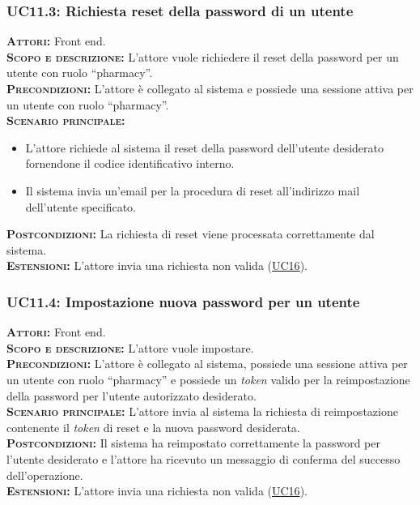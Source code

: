 \subsubsection{UC11.3: Richiesta reset della password di un utente}
\label{sec:UC113}
\textsc{\textbf{Attori:}} Front end.\\
\textsc{\textbf{Scopo e descrizione:}} L'attore vuole richiedere il reset della password per un utente con ruolo ``pharmacy''.\\
\textsc{\textsc{\textbf{Precondizioni:}}} L'attore è collegato al sistema e possiede una sessione attiva per un utente con ruolo ``pharmacy''.\\
\textsc{\textbf{Scenario principale:}} 
\begin{itemize}
    \item L'attore richiede al sistema il reset della password dell'utente desiderato fornendone il codice identificativo interno.
    \item Il sistema invia un'email per la procedura di reset all'indirizzo mail dell'utente specificato.
\end{itemize}
\textsc{\textbf{Postcondizioni:}} La richiesta di reset viene processata correttamente dal sistema.\\
\textsc{\textbf{Estensioni:}} L'attore invia una richiesta non valida (\hyperref[sec:UC16]{UC16}).

\subsubsection{UC11.4: Impostazione nuova password per un utente}
\label{sec:UC114}
\textsc{\textbf{Attori:}} Front end.\\
\textsc{\textbf{Scopo e descrizione:}} L'attore vuole impostare.\\
\textsc{\textsc{\textbf{Precondizioni:}}} L'attore è collegato al sistema, possiede una sessione attiva per un utente con ruolo ``pharmacy'' e possiede un \textit{token} valido per la reimpostazione della password per l'utente autorizzato desiderato.\\
\textsc{\textbf{Scenario principale:}} L'attore invia al sistema la richiesta di reimpostazione contenente il \textit{token} di reset e la nuova password desiderata.\\
\textsc{\textbf{Postcondizioni:}} Il sistema ha reimpostato correttamente la password per l'utente desiderato e l'attore ha ricevuto un messaggio di conferma del successo dell'operazione.\\
\textsc{\textbf{Estensioni:}} L'attore invia una richiesta non valida (\hyperref[sec:UC16]{UC16}).

